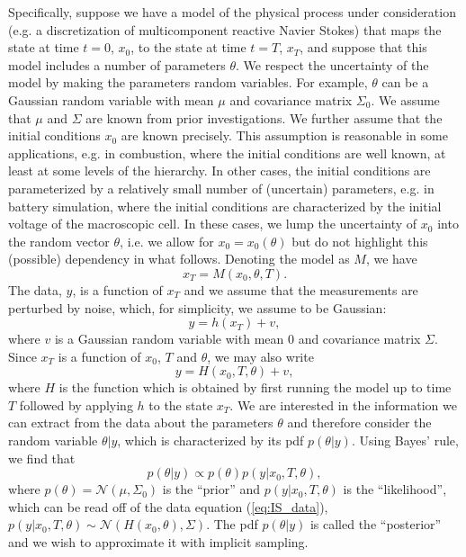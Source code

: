 \documentclass[11pt]{article}
\newcommand{\MarginPar}[1]{\marginpar{%
\vskip-\baselineskip %
\raggedright\tiny\sffamily
\hrule\smallskip{\color{red}#1}\par\smallskip\hrule}}
\begin{document}
Specifically, suppose we have  a  model of the physical process under consideration (e.g. a discretization of multicomponent reactive Navier Stokes) that maps the state at time $t=0$, $x_0$, to the state at time $t=T$, $x_T$, and suppose that this model includes a number of parameters $\theta$. We respect the uncertainty of the model by making the parameters random variables. For example, $\theta$ can be a Gaussian random variable with mean $\mu$ and covariance matrix $\Sigma_0$. We assume that $\mu$ and $\Sigma$ are known from prior investigations. We further assume that the initial conditions $x_0$ are known precisely. This assumption is reasonable in some applications, e.g. in combustion, where the initial conditions are well known, at least at some levels of the hierarchy. In other cases, the initial conditions are parameterized by a relatively small number of (uncertain) parameters, e.g. in battery simulation, where the initial conditions are characterized by the initial voltage of the macroscopic cell. In these cases, we lump the uncertainty of $x_0$ into the random vector $\theta$, i.e. we allow for $x_0 =x_0(\theta)$ but do not highlight this (possible) dependency in what follows. \MarginPar{Matti: is this correct?} Denoting the model as $M$, we have
\begin{equation}
	x_T = M(x_0,\theta, T).
\end{equation}
The data, $y$, is a function of $x_T$ and we assume that the measurements are perturbed by noise, which, for simplicity, we assume to be Gaussian:
\begin{equation}
	y = h(x_T)+v,
\end{equation}
where $v$ is a Gaussian random variable with mean $0$ and covariance matrix $\Sigma$. Since $x_T$ is a function of $x_0$, $T$ and $\theta$, we may also write
\begin{equation}
\label{eq:IS_data}
	y = H(x_0,T,\theta)+v,
\end{equation}
where $H$ is the function which is obtained by first running the model up to time $T$ followed by applying $h$ to the state $x_T$.  We are interested in the information we can extract from the data about the parameters $\theta$ and therefore consider the random variable $\theta|y$, which is characterized by its pdf $p(\theta|y)$. Using Bayes' rule, we find that
\begin{equation}
	p(\theta|y) \propto p(\theta)p(y|x_0,T,\theta),
\end{equation}
where  $p(\theta) = \mathcal{N}(\mu,\Sigma_0)$ is the ``prior'' and $p(y|x_0,T,\theta)$ is the ``likelihood'', which can be read off of the data equation (\ref{eq:IS_data}), $p(y|x_0,T,\theta)\sim \mathcal{N}(H(x_0,\theta),\Sigma)$.
The pdf $p(\theta|y)$  is called the ``posterior'' and we wish to approximate it with implicit sampling. 
\end{document}
